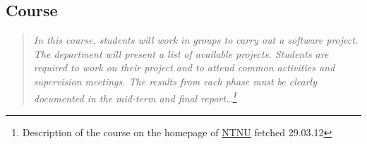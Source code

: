    \subsection{Course}\label{Course}
    \begin{quotation}
    \em In this course, students will work in groups to carry out a software project. The department will present a list of available projects. Students are required to work on their project and to attend common activities and supervision meetings. The results from each phase must be clearly documented in the mid-term and final report\ldots\footnote{Description of the course on the homepage of \href{http://www.ntnu.edu/studies/courses/IT2901}{NTNU} fetched 29.03.12}
    \end{quotation}
